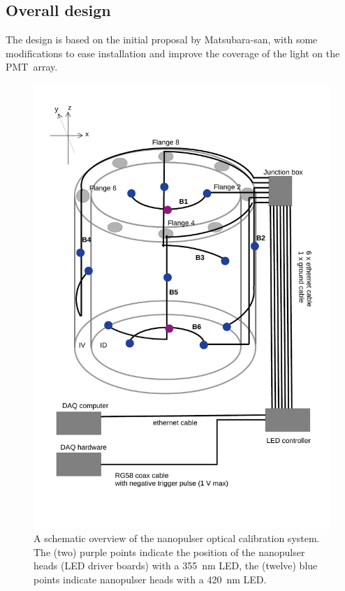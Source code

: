 


\subsection*{Overall design}

%
%

The design is based on the initial proposal by Matsubara-san, with some modifications to ease installation and improve the coverage of the light on the PMT~array.


\begin{figure}
\begin{center}	
  \includegraphics[width=0.75\linewidth]{figures/JSNS2_led_system_overview.pdf}
  \caption{A schematic overview of the nanopulser optical calibration system. The (two) purple points indicate the position of the nanopulser heads (LED driver boards) with a 355~nm LED, the (twelve) blue points indicate nanopulser heads with a 420~nm LED.}
  \label{figure:controlbox}
\end{center}
\end{figure}

